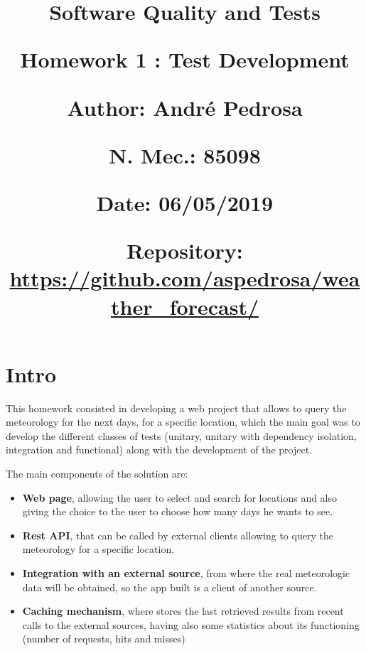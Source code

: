 \documentclass[12pt]{article}
\begin{document}
\title{\vspace{-0.9cm}
       \Large\raggedright\textbf{Software Quality and Tests} \\ 
       \large\raggedright\textbf{Homework 1 : Test Development} \\ 
       \vspace{0.5cm}
       \normalsize
       \raggedright\textbf{Author: \hspace{1.1cm} André Pedrosa} \\ \vspace{0.1cm}
       \raggedright\textbf{N. Mec.: \hspace{0.92cm} 85098} \\ \vspace{0.1cm}
       \raggedright\textbf{Date: \hspace{1.6cm} 06/05/2019} \\ \vspace{0.1cm}
       \raggedright\textbf{Repository: \hspace{0.35cm} \url{https://github.com/aspedrosa/weather\_forecast/}} \\}
\date{} %

\maketitle
\thispagestyle{fancy}

\vspace{-1.4cm}

\tableofcontents

\newpage

\section{Intro}

This homework consisted in developing a web project that allows to query the
  meteorology for the next days, for a specific location, which the main goal
  was to develop the different classes of tests (unitary, unitary with dependency isolation,
  integration and functional) along with the development of the project.

The main components of the solution are:
\begin{itemize}
  \item \textbf{Web page}, allowing the user to select and search for locations and also giving
    the choice to the user to choose how many days he wants to see.
  \item \textbf{Rest API}, that can be called by external clients allowing to query the
    meteorology for a specific location.
  \item \textbf{Integration with an external source}, from where the real meteorologic data will be
    obtained, so the app built is a client of another source.
  \item \textbf{Caching mechanism}, where stores the last retrieved results from recent calls to the
    external sources, having also some statistics about its functioning (number of requests,
    hits and misses)
\end{itemize}
\end{document}
